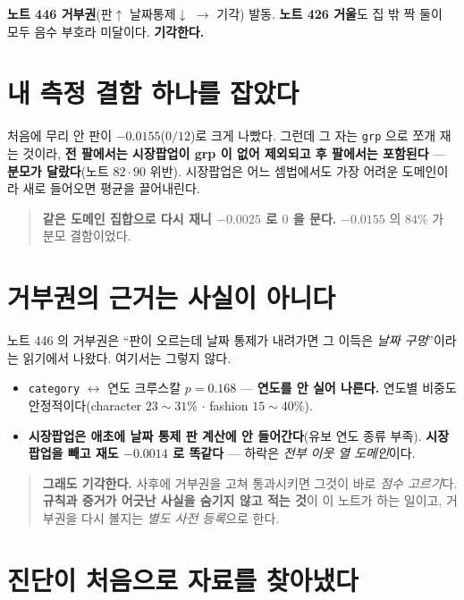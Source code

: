 \documentclass[11pt]{article}
\begin{document}
\textbf{노트 446 거부권}(판$\uparrow$ 날짜통제$\downarrow$ $\to$ 기각) 발동.
\textbf{노트 426 거울}도 집 밖 짝 둘이 모두 음수 부호라 미달이다.
\textbf{기각한다.}

\section{내 측정 결함 하나를 잡았다}

처음에 무리 안 판이 $-0.0155$($0/12$)로 크게 나빴다. 그런데 그 자는
\texttt{grp} 으로 쪼개 재는 것이라, \textbf{전 팔에서는 시장팝업이 grp 이 없어
제외되고 후 팔에서는 포함된다} --- \textbf{분모가 달랐다}(노트 $82 \cdot 90$
위반). 시장팝업은 어느 셈법에서도 가장 어려운 도메인이라 새로 들어오면 평균을
끌어내린다.

\begin{quote}
\textbf{같은 도메인 집합으로 다시 재니 $-0.0025$ 로 $0$ 을 문다.}
$-0.0155$ 의 $84\%$ 가 분모 결함이었다.
\end{quote}

\section{거부권의 근거는 사실이 아니다}

노트 446 의 거부권은 ``판이 오르는데 날짜 통제가 내려가면 그 이득은
\emph{날짜 구멍}''이라는 읽기에서 나왔다. 여기서는 그렇지 않다.

\begin{itemize}
\item \texttt{category} $\leftrightarrow$ 연도 크루스칼 $p = \mathbf{0.168}$
--- \textbf{연도를 안 실어 나른다.} 연도별 비중도 안정적이다(character
$23\!\sim\!31\%$ $\cdot$ fashion $15\!\sim\!40\%$).
\item \textbf{시장팝업은 애초에 날짜 통제 판 계산에 안 들어간다}(유보 연도
종류 부족). \textbf{시장팝업을 빼고 재도 $-0.0014$ 로 똑같다} --- 하락은
\emph{전부 이웃 열 도메인}이다.
\end{itemize}

\begin{quote}
\textbf{그래도 기각한다.} 사후에 거부권을 고쳐 통과시키면 그것이 바로
\emph{점수 고르기}다. \textbf{규칙과 증거가 어긋난 사실을 숨기지 않고 적는
것}이 이 노트가 하는 일이고, 거부권을 다시 볼지는 \emph{별도 사전 등록}으로
한다.
\end{quote}

\section{진단이 처음으로 자료를 찾아냈다}
\end{document}
